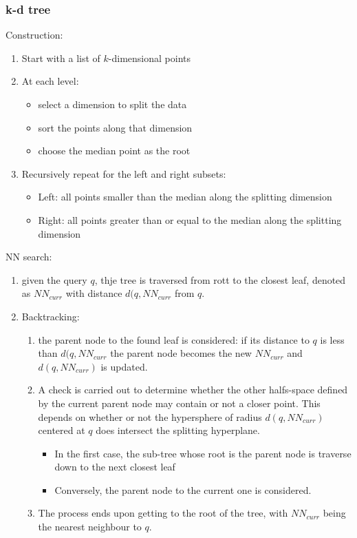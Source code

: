 \documentclass{article}
\begin{document}
\subsubsection{k-d tree}
Construction:
\begin{enumerate}
    \item Start with a list of $k$-dimensional points 
    \item At each level: 
        \begin{itemize}
            \item select a dimension to split the data 
            \item sort the points along that dimension 
            \item choose the median point as the root
        \end{itemize} 
    \item Recursively repeat for the left and right subsets:
        \begin{itemize}
            \item Left: all points smaller than the median along the splitting dimension 
            \item Right: all points greater than or equal to the median along the splitting dimension
        \end{itemize}
\end{enumerate}
NN search:
\begin{enumerate}
    \item given the query $q$, thje tree is traversed from rott to the closest leaf, denoted as $NN_{curr}$ with distance $d(q,NN_{curr}$ from $q$. 
    \item Backtracking:
        \begin{enumerate}
            \item the parent node to the found leaf is considered: if its distance to $q$ is less than $d(q,NN_{curr}$ the parent node becomes the new $NN_{curr}$ and $d(q,NN_{curr})$ is updated. 
            \item A check is carried out to determine whether the other halfs-space defined by the current parent node may contain or not a closer point. This depends on whether or not the hypersphere of radius $d(q,NN_{curr})$ centered at $q$ does intersect the splitting hyperplane.
                \begin{itemize}
                    \item In the first case, the sub-tree whose root is the parent node is traverse down to the next closest leaf 
                    \item Conversely, the parent node to the current one is considered.
                \end{itemize}
            \item The process ends upon getting to the root of the tree, with $NN_{curr}$ being the nearest neighbour to $q$.
        \end{enumerate}
\end{enumerate}
\end{document}

